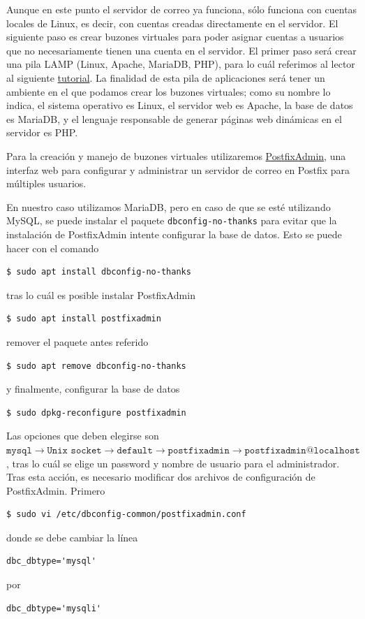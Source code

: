 \documentclass{article}
\newcommand{\ttt}[1]{%
\texttt{#1}%
}
\begin{document}
Aunque en este punto el servidor de correo ya funciona,
s\'olo funciona con cuentas locales de Linux, es decir,
con cuentas creadas directamente en el servidor.   El
siguiente paso es crear buzones virtuales para poder
asignar cuentas a usuarios que no necesariamente tienen
una cuenta en el servidor.    El primer paso ser\'a
crear una pila LAMP (Linux, Apache, MariaDB, PHP),
para lo cu\'al referimos al lector al siguiente
\href{https://www.linuxbabe.com/ubuntu/install-lamp-stack-ubuntu-20-04-server-desktop}{tutorial}.   La finalidad
de esta pila de aplicaciones ser\'a tener un ambiente
en el que podamos crear los buzones virtuales; como
su nombre lo indica, el sistema operativo es Linux,
el servidor web es Apache, la base de datos es
MariaDB, y el lenguaje responsable de generar p\'aginas
web din\'amicas en el servidor es PHP.

Para la creaci\'on y manejo de buzones virtuales
utilizaremos
\href{http://postfixadmin.sourceforge.net/}{PostfixAdmin},
una interfaz web para configurar y administrar un servidor
de correo en Postfix para m\'ultiples usuarios.

En nuestro caso utilizamos MariaDB, pero en caso de
que se est\'e utilizando MySQL, se puede instalar
el paquete \ttt{dbconfig-no-thanks} para evitar que
la instalaci\'on de PostfixAdmin intente configurar
la base de datos.   Esto se puede hacer con el comando
\begin{lstlisting}
$ sudo apt install dbconfig-no-thanks
\end{lstlisting}
tras lo cu\'al es posible instalar PostfixAdmin
\begin{lstlisting}
$ sudo apt install postfixadmin
\end{lstlisting}
remover el paquete antes referido
\begin{lstlisting}
$ sudo apt remove dbconfig-no-thanks
\end{lstlisting}
y finalmente, configurar la base de datos
\begin{lstlisting}
$ sudo dpkg-reconfigure postfixadmin
\end{lstlisting}

Las opciones que deben elegirse son
$\ttt{mysql} \to \ttt{Unix socket} \to
 \ttt{default} \to \ttt{postfixadmin} \to
 \ttt{postfixadmin@localhost}$, tras lo
cu\'al se elige un password y nombre de
usuario para el administrador.   Tras
esta acci\'on, es necesario modificar
dos archivos de configuraci\'on de
PostfixAdmin.   Primero
\begin{lstlisting}
$ sudo vi /etc/dbconfig-common/postfixadmin.conf
\end{lstlisting}
donde se debe cambiar la l\'inea
\begin{lstlisting}
dbc_dbtype='mysql'
\end{lstlisting}
por
\begin{lstlisting}
dbc_dbtype='mysqli'
\end{lstlisting}
\end{document}
